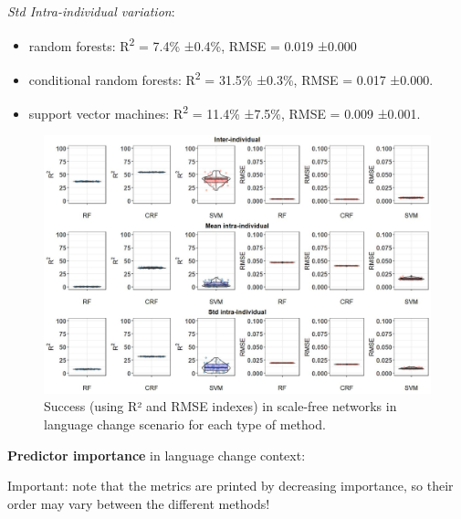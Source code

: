 \documentclass[
]{article}
\providecommand{\tightlist}{%
  \setlength{\itemsep}{0pt}\setlength{\parskip}{0pt}}
\begin{document}
\emph{Std Intra-individual variation}:

\begin{itemize}
\tightlist
\item
  random forests: R\textsuperscript{2} = 7.4\% ±0.4\%, RMSE = 0.019
  ±0.000
\item
  conditional random forests: R\textsuperscript{2} = 31.5\% ±0.3\%, RMSE
  = 0.017 ±0.000.
\item
  support vector machines: R\textsuperscript{2} = 11.4\% ±7.5\%, RMSE =
  0.009 ±0.001.
\end{itemize}

\begin{figure}[!H]

{\centering \includegraphics{./Figures/unnamed-chunk-109-1} 

}

\caption{Success (using R² and RMSE indexes) in scale-free networks in language change scenario for each type of method.}\label{fig:unnamed-chunk-109}
\end{figure}

\textbf{Predictor importance} in language change context:

Important: note that the metrics are printed by decreasing importance,
so their order may vary between the different methods!
\end{document}
